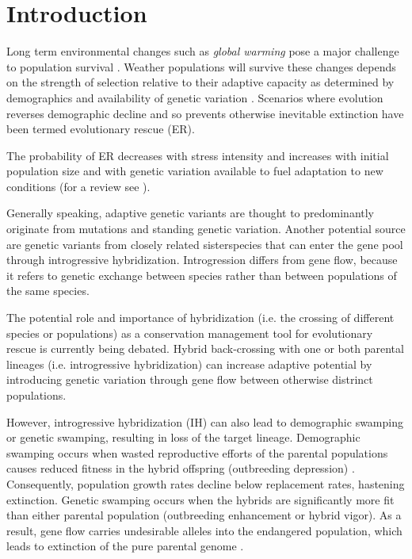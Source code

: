 \documentclass[a4paper,10pt]{article}
\begin{document}
 
\section*{Introduction}

Long term environmental changes such as \textit{global warming} pose a major challenge to population survival \cite{parmesan2006ecological} \cite{hughes2000biological}. Weather populations will survive these changes depends on the strength of selection relative to their adaptive capacity as determined by demographics and availability of genetic variation \cite{lynch1993evolution} \cite{gomulkiewicz1995does} \cite{orr2008population}. Scenarios where evolution reverses demographic decline and so prevents otherwise inevitable extinction have been termed evolutionary rescue (ER). 

The probability of ER decreases with stress intensity and increases with initial population size and with genetic variation available to fuel adaptation to new conditions (for a review see \cite{bell2008adaptation}). 

Generally speaking, adaptive genetic variants are thought to predominantly originate from mutations and standing genetic variation. Another potential source are genetic variants from closely related sisterspecies that can enter the gene pool through introgressive hybridization. Introgression differs from gene flow, because it refers to genetic exchange between species rather than between populations of the same species. 

The potential role and importance of hybridization (i.e. the crossing of different species or populations) as a conservation management tool for evolutionary rescue is currently being debated. Hybrid back-crossing with one or both parental lineages (i.e. introgressive hybridization) can increase adaptive potential by introducing genetic variation through gene flow between otherwise distrinct populations.
	
However, introgressive hybridization (IH) can also lead to demographic swamping or genetic swamping, resulting in loss of the target lineage. Demographic swamping occurs when wasted reproductive efforts of the parental populations causes reduced fitness in the hybrid offspring (outbreeding depression) \cite{wolf2001predicting}. Consequently, population growth rates decline below replacement rates, hastening extinction. Genetic swamping occurs when the hybrids are significantly more fit than either parental population (outbreeding enhancement or hybrid vigor). As a result, gene flow carries undesirable alleles into the endangered population, which leads to extinction of the pure parental genome \cite{woodruff1987fifty} \cite{allendorf2001problems}. 
\end{document}
